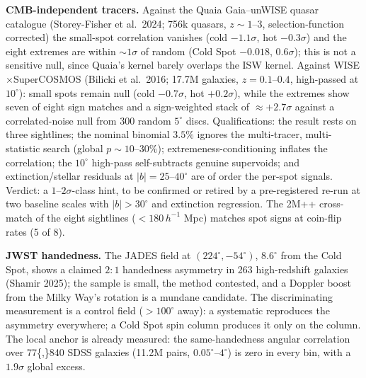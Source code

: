\documentclass[
  11pt,
]{article}
\begin{document}
\textbf{CMB-independent tracers.} Against the Quaia Gaia--unWISE quasar
catalogue (Storey-Fisher et al.~2024; 756k quasars, \(z \sim 1\)--\(3\),
selection-function corrected) the small-spot correlation vanishes (cold
\(-1.1\sigma\), hot \(-0.3\sigma\)) and the eight extremes are within
\(\sim\!1\sigma\) of random (Cold Spot \(-0.018\), \(0.6\sigma\)); this
is not a sensitive null, since Quaia's kernel barely overlaps the ISW
kernel. Against WISE\(\times\)SuperCOSMOS (Bilicki et al.~2016; 17.7M
galaxies, \(z = 0.1\)--\(0.4\), high-passed at \(10^\circ\)): small
spots remain null (cold \(-0.7\sigma\), hot \(+0.2\sigma\)), while the
extremes show seven of eight sign matches and a sign-weighted stack of
\(\approx +2.7\sigma\) against a correlated-noise null from 300 random
\(5^\circ\) discs. Qualifications: the result rests on three sightlines;
the nominal binomial \(3.5\%\) ignores the multi-tracer, multi-statistic
search (global \(p \sim 10\)--\(30\%\)); extremeness-conditioning
inflates the correlation; the \(10^\circ\) high-pass self-subtracts
genuine supervoids; and extinction/stellar residuals at
\(|b| = 25\)--\(40^\circ\) are of order the per-spot signals. Verdict: a
\(1\)--\(2\sigma\)-class hint, to be confirmed or retired by a
pre-registered re-run at two baseline scales with \(|b| > 30^\circ\) and
extinction regression. The 2M++ cross-match of the eight sightlines
(\(< 180\,h^{-1}\) Mpc) matches spot signs at coin-flip rates (5 of 8).

\textbf{JWST handedness.} The JADES field at \((224^\circ, -54^\circ)\),
\(8.6^\circ\) from the Cold Spot, shows a claimed \(2\!:\!1\) handedness
asymmetry in 263 high-redshift galaxies (Shamir 2025); the sample is
small, the method contested, and a Doppler boost from the Milky Way's
rotation is a mundane candidate. The discriminating measurement is a
control field (\(> 100^\circ\) away): a systematic reproduces the
asymmetry everywhere; a Cold Spot spin column produces it only on the
column. The local anchor is already measured: the same-handedness
angular correlation over 77\{,\}840 SDSS galaxies (11.2M pairs,
\(0.05^\circ\)--\(4^\circ\)) is zero in every bin, with a \(1.9\sigma\)
global excess.
\end{document}
